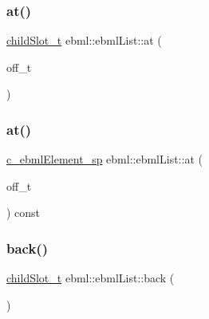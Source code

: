 \mbox{\label{classebml_1_1ebmlList_af07f5e6d2e1e9d7f2f85c49447aefec1}} 
\subsubsection{\texorpdfstring{at()}{at()}\hspace{0.1cm}{\footnotesize\ttfamily [1/2]}}
{\footnotesize\ttfamily \mbox{\hyperlink{classebml_1_1childSlot__t}{child\+Slot\+\_\+t}} ebml\+::ebml\+List\+::at (\begin{DoxyParamCaption}\item[{off\+\_\+t}]{ }\end{DoxyParamCaption})}

\mbox{\label{classebml_1_1ebmlList_aee4aa9a8875e80e6a6583d85e86fe7f5}} 
\subsubsection{\texorpdfstring{at()}{at()}\hspace{0.1cm}{\footnotesize\ttfamily [2/2]}}
{\footnotesize\ttfamily \mbox{\hyperlink{namespaceebml_a2deef4e8071531b32e3533f1bf978917}{c\+\_\+ebml\+Element\+\_\+sp}} ebml\+::ebml\+List\+::at (\begin{DoxyParamCaption}\item[{off\+\_\+t}]{ }\end{DoxyParamCaption}) const}

\mbox{\label{classebml_1_1ebmlList_a038cf53176c9e4cf80930e7deef86714}} 
\subsubsection{\texorpdfstring{back()}{back()}\hspace{0.1cm}{\footnotesize\ttfamily [1/2]}}
{\footnotesize\ttfamily \mbox{\hyperlink{classebml_1_1childSlot__t}{child\+Slot\+\_\+t}} ebml\+::ebml\+List\+::back (\begin{DoxyParamCaption}{ }\end{DoxyParamCaption})}

